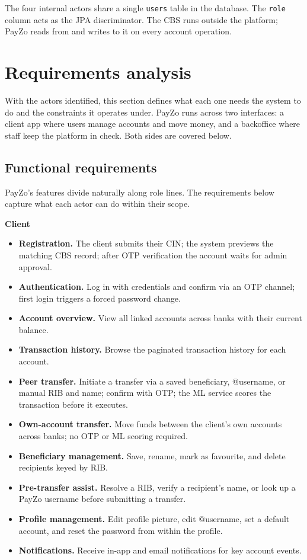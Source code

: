 \documentclass[12pt,a4paper]{report}
\begin{document}
The four internal actors share a single \texttt{users} table in the database. The \texttt{role}
column acts as the JPA discriminator. The CBS runs outside the platform; PayZo reads from
and writes to it on every account operation.

\section{Requirements analysis}

With the actors identified, this section defines what each one needs the system to do and the
constraints it operates under. PayZo runs across two interfaces: a client app where users
manage accounts and move money, and a backoffice where staff keep the platform in check.
Both sides are covered below.

\subsection{Functional requirements}

PayZo's features divide naturally along role lines. The requirements below capture what each
actor can do within their scope.

\vspace{4pt}\noindent\textbf{Client}\par\nopagebreak
\begin{itemize}[leftmargin=1.4em]
  \item \textbf{Registration.} The client submits their CIN; the system previews the matching
        CBS record; after OTP verification the account waits for admin approval.
  \item \textbf{Authentication.} Log in with credentials and confirm via an OTP channel; first
        login triggers a forced password change.
  \item \textbf{Account overview.} View all linked accounts across banks with their current
        balance.
  \item \textbf{Transaction history.} Browse the paginated transaction history for each account.
  \item \textbf{Peer transfer.} Initiate a transfer via a saved beneficiary, @username, or
        manual RIB and name; confirm with OTP; the ML service scores the transaction before
        it executes.
  \item \textbf{Own-account transfer.} Move funds between the client's own accounts across
        banks; no OTP or ML scoring required.
  \item \textbf{Beneficiary management.} Save, rename, mark as favourite, and delete recipients
        keyed by RIB.
  \item \textbf{Pre-transfer assist.} Resolve a RIB, verify a recipient's name, or look up a
        PayZo username before submitting a transfer.
  \item \textbf{Profile management.} Edit profile picture, edit @username, set a default account, and reset the
        password from within the profile.
  \item \textbf{Notifications.} Receive in-app and email notifications for key account events.
\end{itemize}
\end{document}

